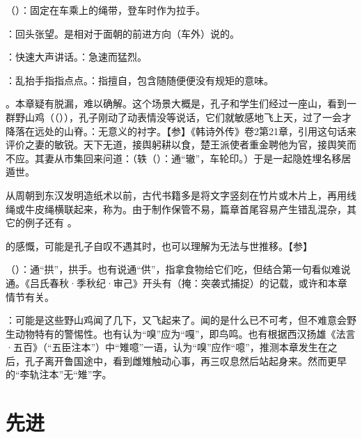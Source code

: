 {
\item {}（）：固定在车乘上的绳带，登车时作为拉手。
\item {}：回头张望。是相对于面朝的前进方向（车外）说的。
\item {}：快速大声讲话。：急速而猛烈。
\item {}：乱抬手指指点点。：指擅自，包含随随便便没有规矩的意味。
}
{}


{
\item {}。本章疑有脱漏，难以确解。这个场景大概是，孔子和学生们经过一座山，看到一群野山鸡（（）），孔子刚动了动表情没等说话，它们就敏感地飞上天，过了一会才降落在远处的山脊。：无意义的衬字。【参】《韩诗外传》卷2第21章，引用这句话来评价之妻的敏锐。天下无道，接舆躬耕以食，楚王派使者重金聘他为官，接舆笑而不应。其妻从市集回来问道：（轶（）：通“辙”，车轮印。）于是一起隐姓埋名移居遁世。

从周朝到东汉发明造纸术以前，古代书籍多是将文字竖刻在竹片或木片上，再用线绳或牛皮绳横联起来，称为。由于制作保管不易，篇章首尾容易产生错乱混杂，其它的例子还有   。

\item {}的感慨，可能是孔子自叹不遇其时，也可以理解为无法与世推移。【参】 
\item {}（）：通“拱”，拱手。也有说通“供”，指拿食物给它们吃，但结合第一句看似难说通。《吕氏春秋·季秋纪·审己》开头有（掩：突袭式捕捉）的记载，或许和本章情节有关。
\item {}：可能是这些野山鸡闻了几下，又飞起来了。闻的是什么已不可考，但不难意会野生动物特有的警惕性。也有认为“嗅”应为“嘎”，即鸟鸣。也有根据西汉扬雄《法言·五百》（“五臣注本”）中“雉噫”一语，认为“嗅”应作“噫”，推测本章发生在之后，孔子离开鲁国途中，看到雌雉触动心事，再三叹息然后站起身来。然而更早的“李轨注本”无“雉”字。
}
{}



\chapter{先进}

